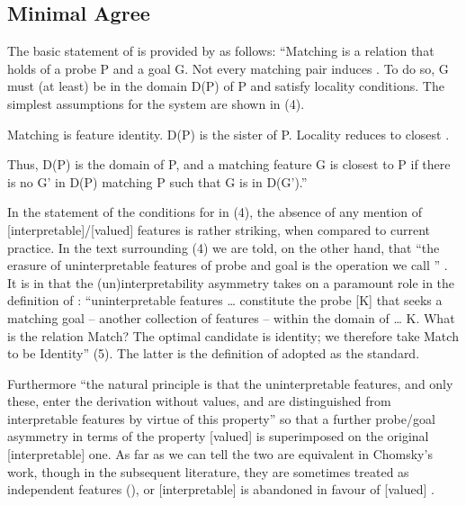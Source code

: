 \documentclass[output=paper]{langsci/langscibook}
\begin{document}
\subsection{Minimal Agree} %

The basic statement of  is provided by \citet[122]{Chomsky2000} as follows: “Matching is a relation that holds of a probe P and a goal G. Not every matching pair induces . To do so, G must (at least) be in the domain D(P) of P and satisfy locality conditions. The simplest assumptions for the  system are shown in (4).

\ea%
    \label{ex:manzini:4}
    \ea Matching is feature identity.
    \ex D(P) is the sister of P.
    \ex Locality reduces to closest . 
\z
\z

Thus, D(P) is the  domain of P, and a matching feature G is closest to P if there is no G' in D(P) matching P such that G is in D(G').” 

In the statement of the conditions for  in (4), the absence of any mention of [interpretable]/[valued] features is rather striking, when compared to current  practice. In the text surrounding (4) we are told, on the other hand, that “the erasure of uninterpretable features of probe and goal is the operation we call ” \citep[122]{Chomsky2000}. It is in \citet{Chomsky2001Derivation} that the (un)interpretability asymmetry takes on a paramount role in the definition of : “uninterpretable features … constitute the probe [K] that seeks a matching goal – another collection of features – within the domain of … K. What is the relation Match? The optimal candidate is identity; we therefore take Match to be Identity” (5). The latter is the definition of  adopted as the  standard.

Furthermore “the natural principle is that the uninterpretable features, and only these, enter the derivation without values, and are distinguished from interpretable features by virtue of this property” so that a further probe\slash goal asymmetry in terms of the property [valued] is superimposed on the original [interpretable] one. As far as we can tell the two are equivalent in Chomsky’s work, though in the subsequent literature, they are sometimes treated as independent features (\citealt{Pesetsky2007}), or [interpretable] is abandoned in favour of [valued] \citep{Preminger2014}. 
\end{document}
